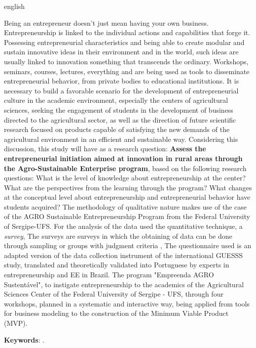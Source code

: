 \setlength{\absparsep}{18pt} %
\begin{resumo}[Abstract]
 \begin{otherlanguage*}{english}
   
Being an entrepreneur doesn't just mean having your own business. Entrepreneurship is linked to the individual actions and capabilities that forge it. Possessing entrepreneurial characteristics and being able to create modular and sustain innovative ideas in their environment and in the world, such ideas are usually linked to innovation something that transcends the ordinary. Workshops, seminars, courses, lectures, everything and are being used as tools to disseminate entrepreneurial behavior, from private bodies to educational institutions.  It is necessary to build a favorable scenario for the development of entrepreneurial culture in the academic environment, especially the centers of agricultural sciences, seeking the engagement of students in the development of business directed to the agricultural sector, as well as the direction of future scientific research focused on products capable of satisfying the new demands of the agricultural environment in an efficient and sustainable way. Considering this discussion, this study will have as a research question: \textbf{Assess the entrepreneurial initiation aimed at innovation in rural areas through the Agro-Sustainable Enterprise program}, based on the following research questions: What is the level of knowledge about entrepreneurship at the center? What are the perspectives from the learning through the program? What changes at the conceptual level about entrepreneurship and entrepreneurial behavior have students acquired? The methodology of qualitative nature makes use of the case of the AGRO Sustainable Entrepreneurship Program from the Federal University of Sergipe-UFS. For the analysis of the data used the quantitative technique, a \textit{survey}, The surveys are surveys in which the obtaining of data can be done through sampling or groups with judgment criteria \cite{visser_survey_2000}, The questionnaire used is an adapted version of the data collection instrument of the international GUESSS study, translated and theoretically validated into Portuguese by experts in entrepreneurship and EE in Brazil. The program "Empreenda AGRO Sustentável", to instigate entrepreneurship to the academics of the Agricultural Sciences Center of the Federal University of Sergipe - UFS, through four workshops, planned in a systematic and interactive way, being applied from tools for business modeling to the construction of the Minimum Viable Product (MVP).

 \textbf{Keywords}: .
 \end{otherlanguage*}
\end{resumo}